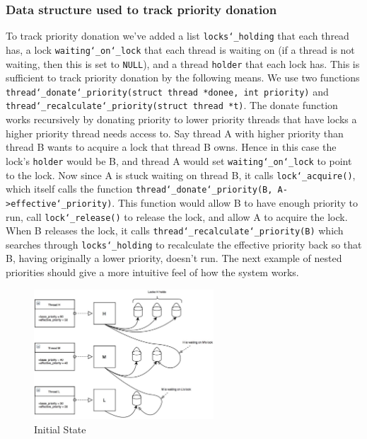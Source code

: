 \documentclass{article}
\renewcommand{\_}{\char`_}
\begin{document}
\subsubsection{Data structure used to track priority donation}
To track priority donation we've added a list \texttt{locks\_holding} that each thread has, a lock \texttt{waiting\_on\_lock} that each thread is waiting on (if a thread is not waiting, then this is set to \texttt{NULL}), and a thread \texttt{holder} that each lock has. This is sufficient to track priority donation by the following means. We use two functions \texttt{thread\_donate\_priority(struct thread *donee, int priority)} and \\ \texttt{thread\_recalculate\_priority(struct thread *t)}. The donate function works recursively by donating priority to lower priority threads that have locks a higher priority thread needs access to. Say thread A with higher priority than thread B wants to acquire a lock that thread B owns. Hence in this case the lock's \texttt{holder} would be B, and thread A would set \texttt{waiting\_on\_lock} to point to the lock. Now since A is stuck waiting on thread B, it calls \texttt{lock\_acquire()}, which itself calls the function \texttt{thread\_donate\_priority(B, A->effective\_priority)}. This function would allow B to have enough priority to run, call \texttt{lock\_release()} to release the lock, and allow A to acquire the lock. When B releases the lock, it calls  \texttt{thread\_recalculate\_priority(B)} which searches through \texttt{locks\_holding} to recalculate the effective priority back so that B, having originally a lower priority, doesn't run. The next example of nested priorities should give a more intuitive feel of how the system works.
\newpage

\begin{figure}[ht!]
\centering
\hspace{3em}
\includegraphics[width=0.6\textwidth]{Images/Task1/1Nested}
\caption{Initial State}
\end{figure}
\end{document}
